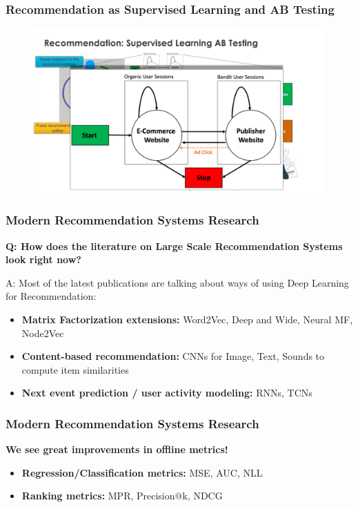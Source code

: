         


 \begin{frame}
  \frametitle{Recommendation as Supervised Learning and AB Testing}
 
 
   \begin{figure}[h!]
     \includegraphics[scale=0.3]{images/recoasabtesting.png}
       \centering
       \label{motex1}
   \end{figure}
     
 \end{frame}





 
\begin{frame}
  \frametitle{Modern Recommendation Systems Research}
  
  \textbf{Q: How does the literature on Large Scale Recommendation Systems look right now?}
  
  A: Most of the latest publications are talking about ways of using Deep Learning for Recommendation:
  \begin{itemize}
  \item \textbf{Matrix Factorization extensions:} Word2Vec, Deep and Wide, Neural MF, Node2Vec 
  \item \textbf{Content-based recommendation:} CNNs for Image, Text, Sounds to compute item similarities
  \item \textbf{Next event prediction / user activity modeling:} RNNs, TCNs
  \end{itemize}
  
\end{frame}


\begin{frame}
  \frametitle{Modern Recommendation Systems Research}
  
  \textbf{We see great improvements in offline metrics!}
  
  \begin{itemize}
  \item \textbf{Regression/Classification metrics:} MSE, AUC, NLL
  \item \textbf{Ranking metrics:} MPR, Precision@k, NDCG
  \end{itemize}
  
\end{frame}


